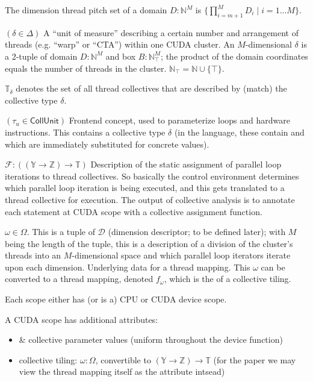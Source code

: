 \filbreak
{} The dimension thread pitch set of a domain $D: \mathbb{N}^M$ is $\{ \prod_{i=m+1}^M D_i \mid i = 1 ... M \}$.

\filbreak
{} $(\delta \in \Delta)$ A ``unit of measure'' describing a certain number and arrangement of threads (e.g. ``warp'' or ``CTA'') within one CUDA cluster.
An $M$-dimensional $\delta$ is a 2-tuple of domain $D: \mathbb{N}^M$ and box $B: \mathbb{N}_\top^M$; the product of the domain coordinates equals the number of threads in the cluster.
$\mathbb{N}_\top = \mathbb{N} \cup \{\top\}$.

$\mathbb{T}_\delta$ denotes the set of all thread collectives that are described by (match) the collective type $\delta$.

\filbreak
{} $(\tau_u \in \mathsf{CollUnit})$
Frontend concept, used to parameterize  loops and hardware instructions.
This contains a collective type $\delta$ (in the language, these contain  and  which are immediately substituted for concrete values).

\filbreak
{} $\mathcal{F}: ((\mathbb{Y} \to \mathbb{Z}) \to \mathbb{T})$
Description of the static assignment of parallel loop iterations to thread collectives.
So basically the control environment determines which parallel loop iteration is being executed, and this gets translated to a thread collective for execution.
The output of collective analysis is to annotate each statement at CUDA scope with a collective assignment function.

\filbreak
{} $\omega \in \Omega$.
This is a tuple of $\mathcal{D}$ (dimension descriptor; to be defined later); with $M$ being the length of the tuple, this is a description of a division of the cluster's threads into an $M$-dimensional space and which parallel loop iterators iterate upon each dimension.
Underlying data for a thread mapping.
This $\omega$ can be converted to a thread mapping, denoted $f_\omega$, which is the  of a collective tiling.


\filbreak
{}

Each scope either has (or is a) CPU or CUDA device scope.

\filbreak
A CUDA scope has additional attributes:
\begin{itemize}
  \item {} \&  collective parameter values (uniform throughout the device function)
  \item collective tiling: $\omega: \Omega$, convertible to $(\mathbb{Y} \to \mathbb{Z}) \to \mathbb{T}$ (for the paper we may view the thread mapping itself as the attribute intsead)
\end{itemize}

